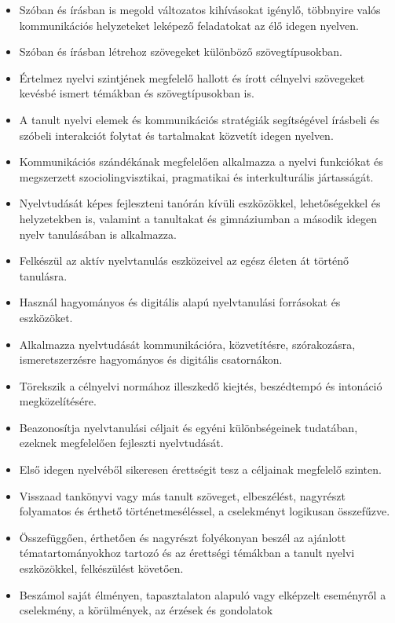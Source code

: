 \begin{itemize}
\item
  Szóban és írásban is megold változatos kihívásokat igénylő, többnyire
  valós kommunikációs helyzeteket leképező feladatokat az élő idegen
  nyelven.
\item
  Szóban és írásban létrehoz szövegeket különböző szövegtípusokban.
\item
  Értelmez nyelvi szintjének megfelelő hallott és írott célnyelvi
  szövegeket kevésbé ismert témákban és szövegtípusokban is.
\item
  A tanult nyelvi elemek és kommunikációs stratégiák segítségével
  írásbeli és szóbeli interakciót folytat és tartalmakat közvetít idegen
  nyelven.
\item
  Kommunikációs szándékának megfelelően alkalmazza a nyelvi funkciókat
  és megszerzett szociolingvisztikai, pragmatikai és interkulturális
  jártasságát.
\item
  Nyelvtudását képes fejleszteni tanórán kívüli eszközökkel,
  lehetőségekkel és helyzetekben is, valamint a tanultakat és
  gimnáziumban a második idegen nyelv tanulásában is alkalmazza.
\item
  Felkészül az aktív nyelvtanulás eszközeivel az egész életen át történő
  tanulásra.
\item
  Használ hagyományos és digitális alapú nyelvtanulási forrásokat és
  eszközöket.
\item
  Alkalmazza nyelvtudását kommunikációra, közvetítésre, szórakozásra,
  ismeretszerzésre hagyományos és digitális csatornákon.
\item
  Törekszik a célnyelvi normához illeszkedő kiejtés, beszédtempó és
  intonáció megközelítésére.
\item
  Beazonosítja nyelvtanulási céljait és egyéni különbségeinek tudatában,
  ezeknek megfelelően fejleszti nyelvtudását.
\item
  Első idegen nyelvéből sikeresen érettségit tesz a céljainak megfelelő
  szinten.
\item
  Visszaad tankönyvi vagy más tanult szöveget, elbeszélést, nagyrészt
  folyamatos és érthető történetmeséléssel, a cselekményt logikusan
  összefűzve.
\item
  Összefüggően, érthetően és nagyrészt folyékonyan beszél az ajánlott
  tématartományokhoz tartozó és az érettségi témákban a tanult nyelvi
  eszközökkel, felkészülést követően.
\item
  Beszámol saját élményen, tapasztalaton alapuló vagy elképzelt
  eseményről a cselekmény, a körülmények, az érzések és gondolatok

\end{itemize}
